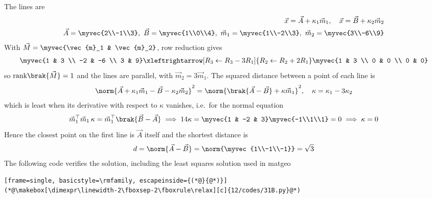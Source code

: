 \begin{enumerate}[label=\thesubsection.\arabic*, ref=\thesubsection.\theenumi]
\solution
The lines are
\begin{align}
	\vec{x} = \vec{A} + \kappa_1\vec{m}_1, \quad \vec{x} = \vec{B} + \kappa_2\vec{m}_2
	\\
	\vec{A} = \myvec{2\\-1\\3},\ \vec{B} = \myvec{1\\0\\4},\ \vec{m}_1 = \myvec{1\\-2\\3},\ \vec{m}_2 = \myvec{3\\-6\\9}
\end{align}
With $\vec{M} = \myvec{\vec{m}_1 & \vec{m}_2}$, row reduction gives
\begin{align}
	\myvec{1 & 3 \\ -2 & -6 \\ 3 & 9}
	\xleftrightarrow[R_3 \leftarrow R_3 - 3R_1]{R_2 \leftarrow R_2 + 2R_1}
	\myvec{1 & 3 \\ 0 & 0 \\ 0 & 0}
\end{align}
so $\text{rank}\brak{\vec{M}} = 1$ and the lines are parallel, with $\vec{m}_2 = 3\vec{m}_1$. The squared distance between a point of each line is
\begin{align}
	\norm{\vec{A} + \kappa_1\vec{m}_1 - \vec{B} - \kappa_2\vec{m}_2}^2 = \norm{\brak{\vec{A}-\vec{B}} + \kappa\vec{m}_1}^2, \quad \kappa = \kappa_1 - 3\kappa_2
\end{align}
which is least when its derivative with respect to $\kappa$ vanishes, i.e.\ for the normal equation
\begin{align}
	\vec{m}_1^{\top}\vec{m}_1\,\kappa = \vec{m}_1^{\top}\brak{\vec{B} - \vec{A}}
	\implies 14\kappa = \myvec{1 & -2 & 3}\myvec{-1\\1\\1} = 0 \implies \kappa = 0
\end{align}
Hence the closest point on the first line is $\vec{A}$ itself and the shortest distance is
\begin{align}
	d = \norm{\vec{A} - \vec{B}} = \norm{\myvec{1\\-1\\-1}} = \sqrt{3}
\end{align}
The following code verifies the solution, including the least squares solution used in matgeo
\begin{lstlisting}[frame=single, basicstyle=\rmfamily, escapeinside={(*@}{@*)}]
(*@\makebox[\dimexpr\linewidth-2\fboxsep-2\fboxrule\relax][c]{12/codes/31B.py}@*)
\end{lstlisting}


\end{enumerate}
